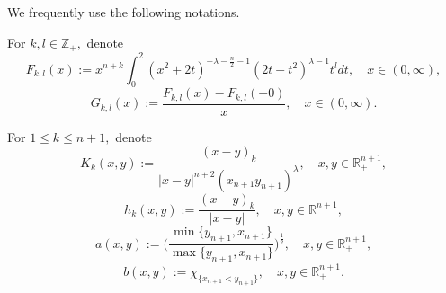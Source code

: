 \documentclass{amsart}
\begin{document}
We frequently use the following notations.
\begin{nota}\label{fkl notation} For $k,l\in\mathbb{Z}_+,$ denote
$$F_{k,l}(x):=x^{n+k}\int_0^2(x^2+2t)^{-\lambda-\frac{n}{2}-1}(2t-t^2)^{\lambda-1}t^ldt,\quad x\in(0,\infty),$$
$$G_{k,l}(x):=\frac{F_{k,l}(x)-F_{k,l}(+0)}{x},\quad x\in(0,\infty).$$	
\end{nota}

\begin{nota} For $1\leq k\leq n+1,$ denote
$$K_k(x,y):=\frac{(x-y)_k}{|x-y|^{n+2}(x_{n+1}y_{n+1})^{\lambda}},\quad x,y\in\mathbb{R}^{n+1}_+,$$	
$$h_k(x,y):=\frac{(x-y)_k}{|x-y|},\quad x,y\in\mathbb{R}^{n+1},$$
$$a(x,y):=\bigg(\frac{\min\{y_{n+1},x_{n+1}\}}{\max\{y_{n+1},x_{n+1}\}}\bigg)^{\frac12},\quad x,y\in\mathbb{R}^{n+1}_+,$$
$$b(x,y):=\chi_{\{x_{n+1}<y_{n+1}\}},\quad x,y\in\mathbb{R}^{n+1}_+.$$
\end{nota}
\end{document}
